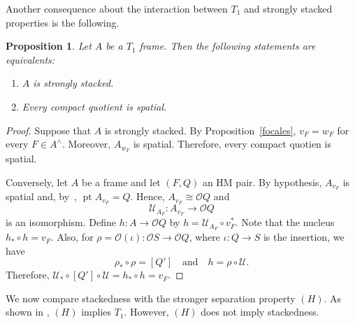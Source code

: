 \documentclass[11pt]{amsart}
\DeclareMathOperator{\pt}{pt}
\theoremstyle{plain}
\newtheorem{prop}[thm]{Proposition}
\theoremstyle{definition}
\begin{document}
Another consequence about the interaction between $T_1$ and strongly stacked properties
is the following.

\begin{prop}\label{Cocientescompactos}
    Let $A$ be a $T_1$ frame. Then the following statements are equivalents:
    \begin{enumerate}
        \item $A$ is strongly stacked.
        \item Every compact quotient is spatial.
    \end{enumerate}
\end{prop}

\begin{proof}
    Suppose that $A$ is strongly stacked. By Proposition~\ref{focales}, $v_F=w_F$ for every $F\in A^\wedge$.
    Moreover, $A_{w_F}$ is spatial. Therefore, every compact quotien is spatial.

    Conversely, let $A$ be a frame and let $(F, Q)$ an HM pair. By hypothesis, $A_{v_F}$ is 
    spatial and, by~\cite[Lemma 5.7.1]{sexton2003}, $\pt A_{v_F}=Q$. Hence, $A_{v_F}\cong \mathcal{O}Q$ and
    \[
    \mathcal{U}_{A_F}\colon A_{v_F}\to \mathcal{O}Q
    \]
    is an isomorphism. Define $h\colon A\to \mathcal{O}Q$ by $h=\mathcal{U}_{A_F}\circ v_F^*$. Note that the 
    nucleus $h_*\circ h=v_F$. Also, for $\rho=\mathcal{O}(\iota)\colon \mathcal{O}S\to \mathcal{O}Q$, where $\iota\colon Q\to S$ is
    the insertion, we have 
    \[
    \rho_*\circ \rho=[Q']\quad \text{and}\quad h=\rho\circ \mathcal{U}.
    \]
    Therefore, $\mathcal{U}_*\circ [Q']\circ \mathcal{U}=h_*\circ h=v_F$.   
\end{proof}

We now compare stackedness with the stronger
separation property $(H)$. As shown in
\cite{PasekaSmarda1992}, $(H)$ implies $T_1$. However,
$(H)$ does not imply stackedness.
\end{document}
